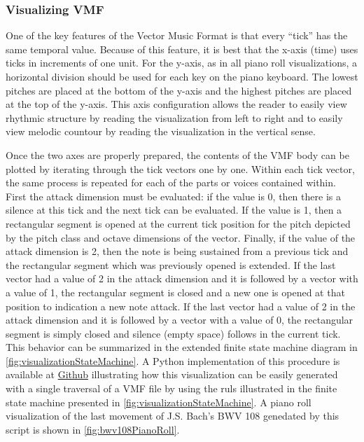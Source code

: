 \subsubsection{Visualizing VMF}

One of the key features of the Vector Music Format is that every ``tick'' has the same temporal value. Because of this feature, it is best that the x-axis (time) uses ticks in increments of one unit. For the y-axis, as in all piano roll visualizations, a horizontal division should be used for each key on the piano keyboard. The lowest pitches are placed at the bottom of the y-axis and the highest pitches are placed at the top of the y-axis. This axis configuration allows the reader to easily view rhythmic structure by reading the visualization from left to right and to easily view melodic countour by reading the visualization in the vertical sense.

Once the two axes are properly prepared, the contents of the VMF body can be plotted by iterating through the tick vectors one by one. Within each tick vector, the same process is repeated for each of the parts or voices contained within. First the attack dimension must be evaluated: if the value is 0, then there is a silence at this tick and the next tick can be evaluated. If the value is 1, then a rectangular segment is opened at the current tick position for the pitch depicted by the pitch class and octave dimensions of the vector. Finally, if the value of the attack dimension is 2, then the note is being sustained from a previous tick and the rectangular segment which was previously opened is extended. If the last vector had a value of 2 in the attack dimension and it is followed by a vector with a value of 1, the rectangular segment is closed and a new one is opened at that position to indication a new note attack. If the last vector had a value of 2 in the attack dimension and it is followed by a vector with a value of 0, the rectangular segment is simply closed and silence (empty space) follows in the current tick. This behavior can be summarized in the extended finite state machine diagram in \ref{fig:visualizationStateMachine}. A Python implementation of this procedure is available at \href{https://github.com/project-schumann/vmf-visualization}{Github} illustrating how this visualization can be easily generated with a single traversal of a VMF file by using the ruls illustrated in the finite state machine presented in \ref{fig:visualizationStateMachine}. A piano roll visualization of the last movement of J.S. Bach's BWV 108 genedated by this script is shown in \ref{fig:bwv108PianoRoll}.

